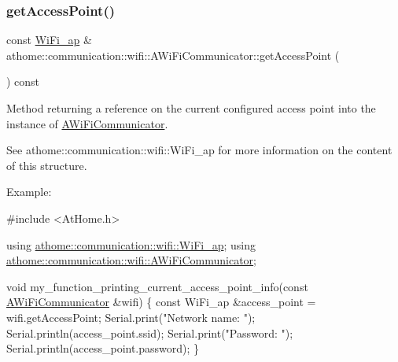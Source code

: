\mbox{\label{classathome_1_1communication_1_1wifi_1_1_a_wi_fi_communicator_abef86486512e4a39d61df3b27effcc87}} 
\subsubsection{\texorpdfstring{get\+Access\+Point()}{getAccessPoint()}}
{\footnotesize\ttfamily const \mbox{\hyperlink{structathome_1_1communication_1_1wifi_1_1s__wifi__access__point}{Wi\+Fi\+\_\+ap}} \& athome\+::communication\+::wifi\+::\+A\+Wi\+Fi\+Communicator\+::get\+Access\+Point (\begin{DoxyParamCaption}{ }\end{DoxyParamCaption}) const}

Method returning a reference on the current configured access point into the instance of \mbox{\hyperlink{classathome_1_1communication_1_1wifi_1_1_a_wi_fi_communicator}{A\+Wi\+Fi\+Communicator}}.

See athome\+::communication\+::wifi\+::\+Wi\+Fi\+\_\+ap for more information on the content of this structure.

Example\+:


\begin{DoxyCode}
\textcolor{preprocessor}{#include <AtHome.h>}

\textcolor{keyword}{using} \mbox{\hyperlink{structathome_1_1communication_1_1wifi_1_1s__wifi__access__point}{athome::communication::wifi::WiFi\_ap}};
\textcolor{keyword}{using} \mbox{\hyperlink{classathome_1_1communication_1_1wifi_1_1_a_wi_fi_communicator}{athome::communication::wifi::AWiFiCommunicator}};

\textcolor{keywordtype}{void} my\_function\_printing\_current\_access\_point\_info(\textcolor{keyword}{const} \mbox{\hyperlink{classathome_1_1communication_1_1wifi_1_1_a_wi_fi_communicator_a0098148fe8d0eeee99b7f8f72a72a900}{AWiFiCommunicator}} &wifi) \{
  \textcolor{keyword}{const} WiFi\_ap &access\_point = wifi.getAccessPoint;
  Serial.print(\textcolor{stringliteral}{"Network name: "});
  Serial.println(access\_point.ssid);
  Serial.print(\textcolor{stringliteral}{"Password: "});
  Serial.println(access\_point.password);
\}
\end{DoxyCode}
 \mbox{\label{classathome_1_1communication_1_1wifi_1_1_a_wi_fi_communicator_afcc41f462a12c8348148c915dcafd1a0}} 
